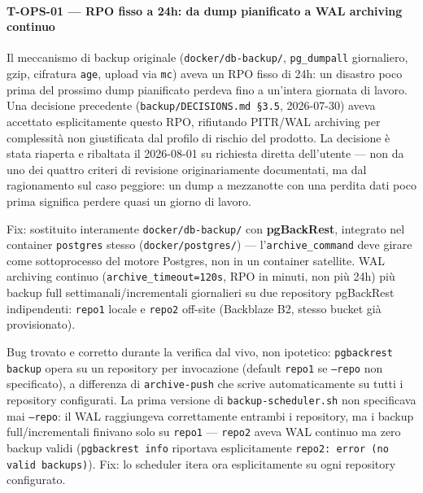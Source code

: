 ﻿\documentclass[a4paper,12pt]{report}
\begin{document}
\paragraph{T-OPS-01 --- RPO fisso a 24h: da dump pianificato a WAL archiving continuo}
Il meccanismo di backup originale (\texttt{docker/db-backup/}, \texttt{pg\_dumpall}
giornaliero, gzip, cifratura \texttt{age}, upload via \texttt{mc}) aveva un RPO
fisso di 24h: un disastro poco prima del prossimo dump pianificato perdeva
fino a un'intera giornata di lavoro. Una decisione precedente
(\texttt{backup/DECISIONS.md~\S3.5}, 2026-07-30) aveva accettato
esplicitamente questo RPO, rifiutando PITR/WAL archiving per complessità
non giustificata dal profilo di rischio del prodotto. La decisione è stata
riaperta e ribaltata il 2026-08-01 su richiesta diretta dell'utente ---
non da uno dei quattro criteri di revisione originariamente documentati,
ma dal ragionamento sul caso peggiore: un dump a mezzanotte con una
perdita dati poco prima significa perdere quasi un giorno di lavoro.

Fix: sostituito interamente \texttt{docker/db-backup/} con
\textbf{pgBackRest}, integrato nel container \texttt{postgres} stesso
(\texttt{docker/postgres/}) --- l'\texttt{archive\_command} deve girare
come sottoprocesso del motore Postgres, non in un container satellite.
WAL archiving continuo (\texttt{archive\_timeout=120s}, RPO in minuti,
non più 24h) più backup full settimanali/incrementali giornalieri su due
repository pgBackRest indipendenti: \texttt{repo1} locale e \texttt{repo2}
off-site (Backblaze B2, stesso bucket già provisionato).

Bug trovato e corretto durante la verifica dal vivo, non ipotetico:
\texttt{pgbackrest backup} opera su un repository per invocazione
(default \texttt{repo1} se \texttt{--repo} non specificato), a differenza
di \texttt{archive-push} che scrive automaticamente su tutti i repository
configurati. La prima versione di \texttt{backup-scheduler.sh} non
specificava mai \texttt{--repo}: il WAL raggiungeva correttamente
entrambi i repository, ma i backup full/incrementali finivano solo su
\texttt{repo1} --- \texttt{repo2} aveva WAL continuo ma zero backup
validi (\texttt{pgbackrest info} riportava esplicitamente
\texttt{repo2: error (no valid backups)}). Fix: lo scheduler itera ora
esplicitamente su ogni repository configurato.
\end{document}
